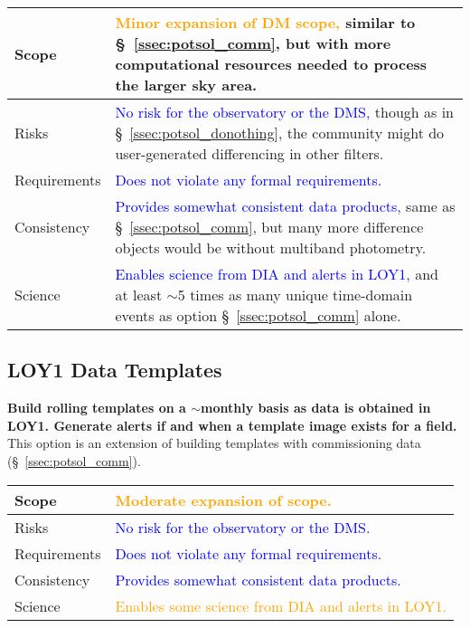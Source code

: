\documentclass[DM,lsstdraft,toc]{lsstdoc}
\begin{document}
\begin{center}
\begin{tabular}{|p{2.5cm}|p{13cm}|}
\hline
Scope & \textcolor{orange}{Minor expansion of DM scope,} similar to \S~\ref{ssec:potsol_comm}, but with more computational resources needed to process the larger sky area.  \\
\hline
Risks & \textcolor{blue}{No risk for the observatory or the DMS,} though as in \S~\ref{ssec:potsol_donothing}, the community might do user-generated differencing in other filters. \\
\hline
Requirements & \textcolor{blue}{Does not violate any formal requirements.} \\
\hline
Consistency & \textcolor{blue}{Provides somewhat consistent data products,} same as \S~\ref{ssec:potsol_comm}, but many more difference objects would be without multiband photometry.  \\
\hline
Science & \textcolor{blue}{Enables science from DIA and alerts in LOY1,} and at least $\sim$5 times as many unique time-domain events as option \S~\ref{ssec:potsol_comm} alone. \\
\hline
\end{tabular}
\end{center}

\clearpage
\subsection{LOY1 Data Templates}\label{ssec:potsol_cont}

{\bf Build rolling templates on a $\sim$monthly basis as data is obtained in LOY1. Generate alerts if and when a template image exists for a field.} This option is an extension of building templates with commissioning data (\S~\ref{ssec:potsol_comm}).

\begin{center}
\begin{tabular}{|p{2.5cm}|p{13cm}|}
\hline
Scope & \textcolor{orange}{Moderate expansion of scope.} \\
\hline
Risks & \textcolor{blue}{No risk for the observatory or the DMS.} \\
\hline
Requirements & \textcolor{blue}{Does not violate any formal requirements.} \\
\hline
Consistency & \textcolor{blue}{Provides somewhat consistent data products.} \\
\hline
Science & \textcolor{orange}{Enables some science from DIA and alerts in LOY1.} \\
\hline
\end{tabular}
\end{center}
\end{document}
